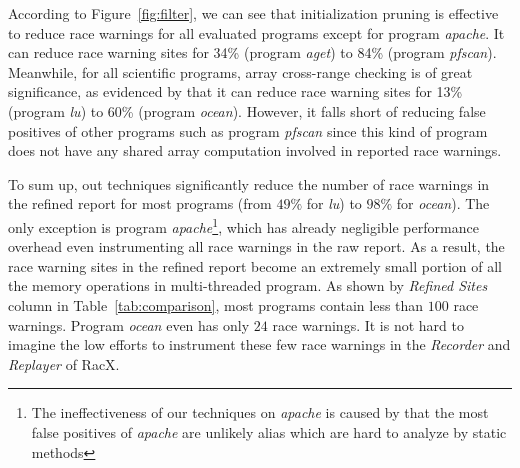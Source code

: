 \documentclass[10pt,onecolumn,letterpaper]{article}
\begin{document}
According to Figure~\ref{fig:filter}, we can see that initialization
pruning is effective to reduce race warnings for all evaluated
programs except for program \emph{apache}. It can reduce race
warning sites for 34\% (program \emph{aget}) to 84\% (program
\emph{pfscan}). Meanwhile, for all scientific programs, array
cross-range checking is of great significance, as evidenced by that
it can reduce race warning sites for 13\% (program \emph{lu}) to
60\% (program \emph{ocean}). However, it falls short of reducing
false positives of other programs such as program \emph{pfscan}
since this kind of program does not have any shared array
computation involved in reported race warnings.


To sum up, out techniques significantly reduce the number of race
warnings in the refined report for most programs (from $49\%$ for
\emph{lu}) to $98\%$ for \emph{ocean}). The only exception is
program \emph{apache}\footnote{The ineffectiveness of our techniques
on \emph{apache} is caused by that the most false positives of
\emph{apache} are unlikely alias which are hard to analyze by static
methods}, which has already negligible performance overhead even
instrumenting all race warnings in the raw report. As a result, the
race warning sites in the refined report become an extremely small
portion of all the memory operations in multi-threaded program. As
shown by \emph{Refined Sites} column in Table~\ref{tab:comparison},
most programs contain less than $100$ race warnings. Program
\emph{ocean} even has only $24$ race warnings. It is not hard to
imagine the low efforts to instrument these few race warnings in the
\emph{Recorder} and \emph{Replayer} of RacX.

\begin{table}[tb]
\caption{Reduced race warning sites for instrumentation in
RacX}\label{tab:comparison}
\end{table}
\end{document}
